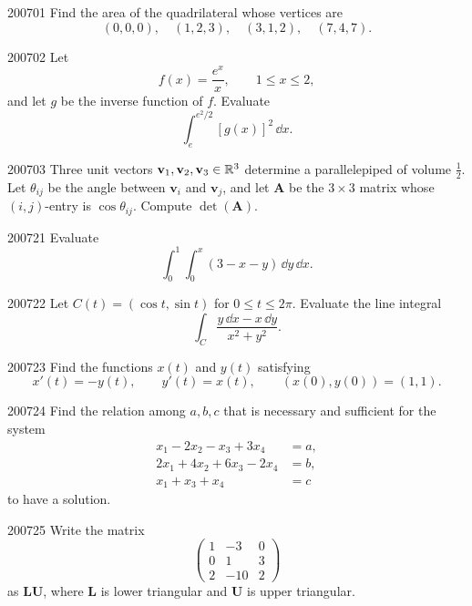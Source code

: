
\begin{problem}{2007}{0}{1}
Find the area of the quadrilateral whose vertices are
\[
    (0, 0, 0), \quad(1, 2, 3), \quad(3, 1, 2), \quad(7, 4, 7).
\]
\end{problem}

\begin{problem}{2007}{0}{2}
Let
\[
    f(x)=\frac{e^x}{x},
    \qquad 1\le x\le2,
\]
and let $g$ be the inverse function of $f$. Evaluate
\[
    \int_e^{e^2/2}[g(x)]^2\, \dd x.
\]
\end{problem}

\begin{problem}{2007}{0}{3}
Three unit vectors $\mathbf v_1, \mathbf v_2, \mathbf v_3\in\mathbb{R}^3$ determine a parallelepiped of volume $\tfrac12$. Let $\theta_{ij}$ be the angle between $\mathbf v_i$ and $\mathbf v_j$, and let $\mathbf A$ be the $3\times3$ matrix whose $(i, j)$-entry is $\cos\theta_{ij}$. Compute $\det(\mathbf A)$.
\end{problem}

\begin{problem}{2007}{2}{1}
Evaluate
\[
    \int_0^1\int_0^x(3-x-y)\, \dd y\, \dd x.
\]
\end{problem}

\begin{problem}{2007}{2}{2}
Let $C(t)=(\cos t, \sin t)$ for $0\le t\le2\pi$. Evaluate the line integral
\[
    \int_C\frac{y\, \dd x-x\, \dd y}{x^2+y^2}.
\]
\end{problem}

\begin{problem}{2007}{2}{3}
Find the functions $x(t)$ and $y(t)$ satisfying
\[
    x'(t)=-y(t),
    \qquad
    y'(t)=x(t),
    \qquad
    (x(0), y(0))=(1, 1).
\]
\end{problem}

\begin{problem}{2007}{2}{4}
Find the relation among $a, b, c$ that is necessary and sufficient for the system
\[
\begin{aligned}
    x_1-2x_2-x_3+3x_4&=a, \\
    2x_1+4x_2+6x_3-2x_4&=b, \\
    x_1+x_3+x_4&=c
\end{aligned}
\]
to have a solution.
\end{problem}

\begin{problem}{2007}{2}{5}
Write the matrix
\[
    \begin{pmatrix}
        1&-3&0\\
        0&1&3\\
        2&-10&2
    \end{pmatrix}
\]
as $\mathbf L\mathbf U$, where $\mathbf L$ is lower triangular and $\mathbf U$ is upper triangular.
\end{problem}


